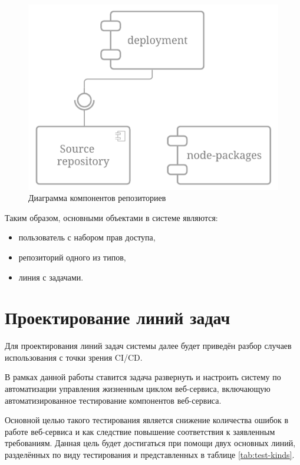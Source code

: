 \begin{figure}[ht]
    \centering
    \includegraphics[scale=0.4]{src/figures/repository-components}
    \caption{Диаграмма компонентов репозиториев}
    \label{fig:repository-components}
\end{figure}

Таким образом, основными объектами в системе являются:
\begin{itemize}
    \item пользователь с набором прав доступа,
    \item репозиторий одного из типов,
    \item линия с задачами.
\end{itemize}

\section{Проектирование линий задач}

Для проектирования линий задач системы далее будет приведён разбор случаев использования с точки зрения CI/CD\cite{ciCd}.

В рамках данной работы ставится задача развернуть и настроить систему по автоматизации управления жизненным циклом веб-сервиса,
включающую автоматизированное тестирование компонентов веб-сервиса.

Основной целью такого тестирования является снижение количества ошибок в работе веб-сервиса и как следствие повышение соответствия к заявленным требованиям.
Данная цель будет достигаться при помощи двух основных линий, разделённых по виду тестирования и представленных в таблице \ref{tab:test-kinds}.

